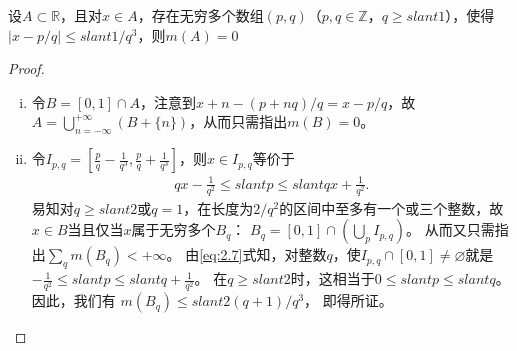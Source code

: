 \documentclass[../../main.tex]{subfiles}
\begin{document}
\begin{example}
设\(A\subset\mathbb{R}\)，且对\(x\in A\)，存在无穷多个数组\((p,q)\)（\(p,q\in\mathbb{Z}\)，\(q\geqslant slant1\)），使得\(\vert x - p/q\vert\leqslant slant1/q^3\)，则\(m(A)=0\)
\end{example}
\begin{proof}
\begin{enumerate}[(i)]
\item 令\(B = [0,1]\cap A\)，注意到\(x + n-(p + nq)/q=x - p/q\)，故\(A=\bigcup_{n = -\infty}^{+\infty}(B+\{n\})\)，从而只需指出\(m(B)=0\)。
\item 令\(I_{p,q}=\left[\frac{p}{q}-\frac{1}{q^3},\frac{p}{q}+\frac{1}{q^3}\right]\)，则\(x\in I_{p,q}\)等价于
\begin{align}
qx-\frac{1}{q^2}\leqslant slant p\leqslant slant qx+\frac{1}{q^2}.\label{eq:2.7}
\end{align}
易知对\(q\geqslant slant2\)或\(q = 1\)，在长度为\(2/q^2\)的区间中至多有一个或三个整数，故\(x\in B\)当且仅当\(x\)属于无穷多个\(B_q\)：
\(B_q = [0,1]\cap\left(\bigcup_{p}I_{p,q}\right)\)。
从而又只需指出\(\sum_{q}m(B_q)<+\infty\)。
由\eqref{eq:2.7}式知，对整数\(q\)，使\(I_{p,q}\cap[0,1]\neq\varnothing\)就是
\(-\frac{1}{q^2}\leqslant slant p\leqslant slant q+\frac{1}{q^2}\)。
在\(q\geqslant slant2\)时，这相当于\(0\leqslant slant p\leqslant slant q\)。因此，我们有
\(m(B_q)\leqslant slant 2(q + 1)/q^3\)，
即得所证。
\end{enumerate} 
\end{proof}
\end{document}
